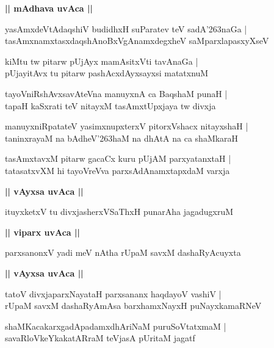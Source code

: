 \documentclass[twoside,12pt,openright]{book}
\def\S{\char'263}
\newcounter{shloka}[chapter]
\def\uvaca#1{\centerline{{\large\textbf{#1}}}}
\begin{document}
\uvaca{|| mAdhava uvAca ||}

\begin{shloka}%
yasAmxdeVtAdaqshiV budidhxH suParatev teV sadA\S naGa |\\
tasAmxnamxtasxdaqshAnoBxVgAnamxdegxheV saMparxlapasxyXseV 
\end{shloka}

\begin{shloka}%
kiMtu tw pitarw pUjAyx mamAsitxVti tavAnaGa |\\
pUjayitAvx tu pitarw pashAcxdAyxsayxsi matatxnuM 
\end{shloka}

\begin{shloka}%
tayoVniRshAvxsavAteVna manuyxnA ca BaqshaM punaH |\\
tapaH kaSxrati teV nitayxM tasAmxtUpxjaya tw divxja 
\end{shloka}

\begin{shloka}%
manuyxniRpatateV yasimxnupxterxV pitorxVshacx nitayxshaH |\\
taninxrayaM na bAdheV\S haM na dhAtA na ca shaMkaraH 
\end{shloka}

\begin{shloka}%
tasAmxtavxM pitarw gacaCx kuru pUjAM parxyatanxtaH |\\
tatasatxvXM hi tayoVreVva parxsAdAnamxtapxdaM varxja
\end{shloka}

\uvaca{|| vAyxsa uvAca ||}

\begin{shloka}%
ituyxketxV  tu divxjasherxVSaThxH punarAha jagadugxruM 
\end{shloka}

\uvaca{|| viparx uvAca ||}

\begin{shloka}%
parxsanonxV yadi meV nAtha rUpaM savxM dashaRyAcuyxta
\end{shloka}

\uvaca{|| vAyxsa uvAca ||}

\begin{shloka}%
tatoV divxjaparxNayataH parxsananx haqdayoV vashiV |\\
rUpaM savxM dashaRyAmAsa barxhamxNayxH puNayxkamaRNeV 
\end{shloka}

\begin{shloka}%
shaMKacakarxgadApadamxdhAriNaM puruSoVtatxmaM |\\
savaRloVkeYkakatARraM teVjasA pUritaM jagatf
\end{shloka}
\end{document}
